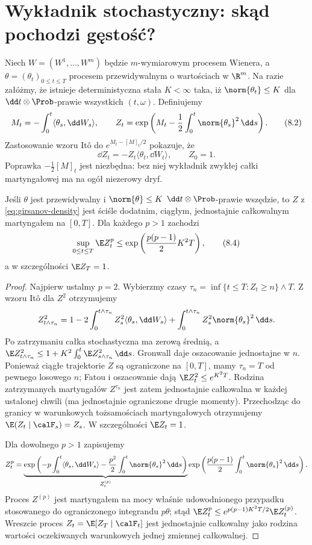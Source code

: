 \section{Wykładnik stochastyczny: skąd pochodzi gęstość?}

Niech $W=(W^1,\ldots,W^m)$ będzie $m$-wymiarowym
procesem Wienera, a $\theta=(\theta_t)_{0\le t\le T}$
procesem przewidywalnym o wartościach w $\R^m$.
Na razie załóżmy, że istnieje deterministyczna stała
$K<\infty$ taka, iż $\norm{\theta_t}\le K$
dla $\dd t\otimes\Prob$-prawie wszystkich $(t,\omega)$.
Definiujemy
\[
M_t=-\int_0^t\langle\theta_s,\dd W_s\rangle,
\qquad
Z_t=\exp\left(M_t-\frac12\int_0^t\norm{\theta_s}^2\,\dd s\right).
\tag{8.2}\label{eq:girsanov-density}
\]
Zastosowanie wzoru Itô do $e^{M_t-[M]_t/2}$
pokazuje, że
\[
\dd Z_t=-Z_t\langle\theta_t,\dd W_t\rangle,
\qquad Z_0=1.
\tag{8.3}\label{eq:density-sde}
\]
Poprawka $-\frac12[M]_t$ jest niezbędna: bez niej
wykładnik zwykłej całki martyngałowej ma na ogół
niezerowy dryf.

\begin{lemat}
\label{lem:bounded-exponential}
Jeśli $\theta$ jest przewidywalny i
$\norm{\theta}\le K$ $\dd t\otimes\Prob$-prawie wszędzie,
to $Z$ z \eqref{eq:girsanov-density} jest ściśle dodatnim,
ciągłym, jednostajnie całkowalnym martyngałem na $[0,T]$.
Dla każdego $p>1$ zachodzi
\[
\sup_{0\le t\le T}\E Z_t^p
\le\exp\left(\frac{p(p-1)}2 K^2T\right),
\tag{8.4}\label{eq:z-moments}
\]
a w szczególności $\E Z_T=1$.
\end{lemat}
\begin{proof}
Najpierw ustalmy $p=2$. Wybierzmy czasy
$\tau_n=\inf\{t\le T:Z_t\ge n\}\wedge T$.
Z wzoru Itô dla $Z^2$ otrzymujemy
\[
Z_{t\wedge\tau_n}^2
=1-2\int_0^{t\wedge\tau_n}Z_s^2\langle\theta_s,\dd W_s\rangle
+\int_0^{t\wedge\tau_n}Z_s^2\norm{\theta_s}^2\,\dd s.
\]
Po zatrzymaniu całka stochastyczna ma zerową średnią,
a $\E Z_{t\wedge\tau_n}^2\le
1+K^2\int_0^t\E Z_{s\wedge\tau_n}^2\,\dd s$.
Gronwall daje oszacowanie jednostajne w $n$.
Ponieważ ciągłe trajektorie $Z$ są ograniczone na
$[0,T]$, mamy $\tau_n=T$ od pewnego losowego $n$;
Fatou i oszacowanie dają $\E Z_t^2\le e^{K^2T}$.
Rodzina zatrzymanych martyngałów $Z^{\tau_n}$
jest zatem jednostajnie całkowalna w każdej ustalonej
chwili (ma jednostajnie ograniczone drugie momenty).
Przechodząc do granicy w warunkowych tożsamościach
martyngałowych otrzymujemy $\E(Z_t\mid\calF_s)=Z_s$.
W szczególności $\E Z_t=1$.

Dla dowolnego $p>1$ zapisujemy
\[
Z_t^p=\underbrace{\exp\left(
-p\int_0^t\langle\theta_s,\dd W_s\rangle
-\frac{p^2}2\int_0^t\norm{\theta_s}^2\,\dd s\right)}_{Z_t^{(p)}}
\exp\left(\frac{p(p-1)}2\int_0^t\norm{\theta_s}^2\,\dd s\right).
\]
Proces $Z^{(p)}$ jest martyngałem na mocy właśnie
udowodnionego przypadku stosowanego do ograniczonego
integrandu $p\theta$; stąd
$\E Z_t^p\le e^{p(p-1)K^2T/2}\E Z_t^{(p)}$.
Wreszcie proces $Z_t=\E[Z_T\mid\calF_t]$ jest
jednostajnie całkowalny jako rodzina wartości oczekiwanych
warunkowych jednej zmiennej całkowalnej.
\end{proof}


